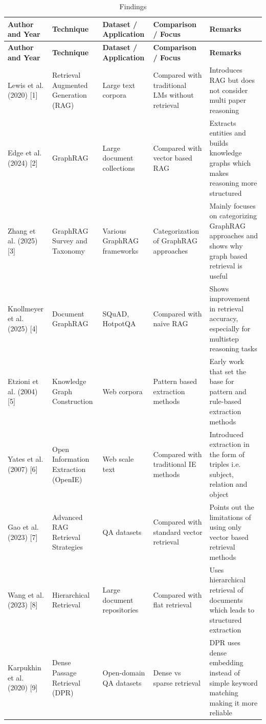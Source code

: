 \documentclass[10pt]{article}
\begin{document}
\begin{longtable}{P{2.1cm} P{2.1cm} P{2.2cm} P{2.9cm} P{5.0cm}}
\caption{Findings}\label{tab:findings}\\
\toprule
\textbf{Author and Year} & \textbf{Technique} & \textbf{Dataset / Application} & \textbf{Comparison / Focus} & \textbf{Remarks}\\
\midrule
\endfirsthead
\toprule
\textbf{Author and Year} & \textbf{Technique} & \textbf{Dataset / Application} & \textbf{Comparison / Focus} & \textbf{Remarks}\\
\midrule
\endhead
Lewis et al. (2020) [1] & Retrieval Augmented Generation (RAG) & Large text corpora & Compared with traditional LMs without retrieval & Introduces RAG but does not consider multi paper reasoning\\
Edge et al. (2024) [2] & GraphRAG & Large document collections & Compared with vector based RAG & Extracts entities and builds knowledge graphs which makes reasoning more structured\\
Zhang et al. (2025) [3] & GraphRAG Survey and Taxonomy & Various GraphRAG frameworks & Categorization of GraphRAG approaches & Mainly focuses on categorizing GraphRAG approaches and shows why graph based retrieval is useful\\
Knollmeyer et al. (2025) [4] & Document GraphRAG & SQuAD, HotpotQA & Compared with naive RAG & Shows improvement in retrieval accuracy, especially for multistep reasoning tasks\\
Etzioni et al. (2004) [5] & Knowledge Graph Construction & Web corpora & Pattern based extraction methods & Early work that set the base for pattern and rule-based extraction methods\\
Yates et al. (2007) [6] & Open Information Extraction (OpenIE) & Web scale text & Compared with traditional IE methods & Introduced extraction in the form of triples i.e. subject, relation and object\\
Gao et al. (2023) [7] & Advanced RAG Retrieval Strategies & QA datasets & Compared with standard vector retrieval & Points out the limitations of using only vector based retrieval methods\\
Wang et al. (2023) [8] & Hierarchical Retrieval & Large document repositories & Compared with flat retrieval & Uses hierarchical retrieval of documents which leads to structured extraction\\
Karpukhin et al. (2020) [9] & Dense Passage Retrieval (DPR) & Open-domain QA datasets & Dense vs sparse retrieval & DPR uses dense embedding instead of simple keyword matching making it more reliable\\

\end{longtable}
\end{document}
